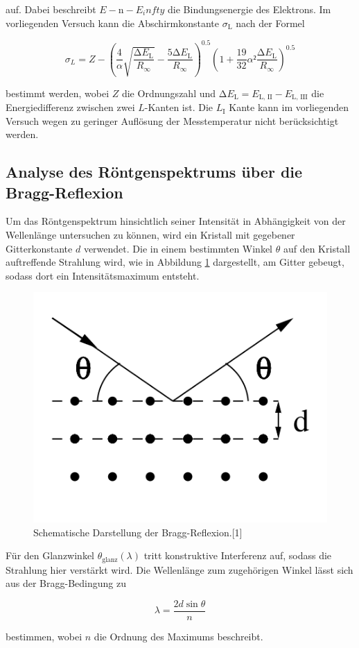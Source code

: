 auf.   
Dabei beschreibt $E-\text{n}-E_infty$ die Bindungsenergie des Elektrons. 
Im vorliegenden Versuch kann die Abschirmkonstante $\sigma_\text{L}$ nach der 
Formel

\begin{equation}
\sigma_L = Z - \left(\frac{4}{\alpha} \sqrt{ \frac{\increment E_\text{L}}{R_\infty}} 
- \frac{5 \increment E_\text{L}}{R_\infty}\right)^{0.5} \left(1 + \frac{19}{32}
\alpha² \frac{\increment E_\text{L}}{R_\infty}\right)^{0.5}
\label{eqn:crap}
\end{equation}

bestimmt werden, wobei $Z$ die Ordnungszahl und $\increment E_\text{L} = E_{\text{L, II}} 
- E_{\text{L, III}}$ die Energiedifferenz zwischen zwei $L$-Kanten ist. 
Die $L_\text{I}$ Kante kann im vorliegenden Versuch wegen zu geringer Auflösung der 
Messtemperatur nicht berücksichtigt werden. 

\subsection{Analyse des Röntgenspektrums über die Bragg-Reflexion}

Um das Röntgenspektrum hinsichtlich seiner Intensität in Abhängigkeit von der 
Wellenlänge untersuchen zu können, wird ein Kristall mit gegebener 
Gitterkonstante $d$ verwendet. 
Die in einem bestimmten Winkel $\theta$ auf den Kristall auftreffende Strahlung
wird, wie in Abbildung \ref{fig:bragg} dargestellt, am Gitter gebeugt, sodass dort ein 
Intensitätsmaximum entsteht. 

\begin{figure}
\centering
\includegraphics[scale = 0.3]{content/bragg.png}
\caption{Schematische Darstellung der Bragg-Reflexion.[1]}
\label{fig:bragg}
\end{figure}

Für den Glanzwinkel $\theta_\text{glanz}(\lambda)$ tritt konstruktive Interferenz 
auf, sodass die Strahlung hier verstärkt wird. Die Wellenlänge zum zugehörigen 
Winkel lässt sich aus der Bragg-Bedingung zu 

\begin{equation}
\lambda = \frac{2 d \sin{\theta}}{n}
\label{eqn:Bragg}
\end{equation}

bestimmen, wobei $n$ die Ordnung des Maximums beschreibt. 